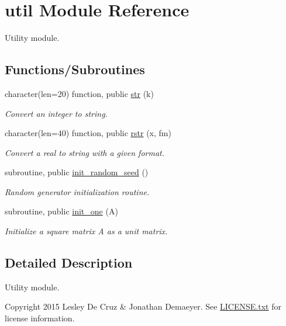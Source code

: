 \hypertarget{namespaceutil}{}\section{util Module Reference}
\label{namespaceutil}


Utility module.  


\subsection*{Functions/\+Subroutines}
\begin{DoxyCompactItemize}
\item 
character(len=20) function, public \hyperlink{namespaceutil_a1df36d0696c9183ceb6bb770f1d88111}{str} (k)
\begin{DoxyCompactList}\small\item\em Convert an integer to string. \end{DoxyCompactList}\item 
character(len=40) function, public \hyperlink{namespaceutil_ac1630658a46867b1f7255eaa51198bf3}{rstr} (x, fm)
\begin{DoxyCompactList}\small\item\em Convert a real to string with a given format. \end{DoxyCompactList}\item 
subroutine, public \hyperlink{namespaceutil_a3c2dcf05b068a55f0066d2b393e75dc7}{init\+\_\+random\+\_\+seed} ()
\begin{DoxyCompactList}\small\item\em Random generator initialization routine. \end{DoxyCompactList}\item 
subroutine, public \hyperlink{namespaceutil_aca7f2465fedb87fef954d8f0c30668c7}{init\+\_\+one} (A)
\begin{DoxyCompactList}\small\item\em Initialize a square matrix A as a unit matrix. \end{DoxyCompactList}\end{DoxyCompactItemize}


\subsection{Detailed Description}
Utility module. 

\begin{DoxyCopyright}{Copyright}
2015 Lesley De Cruz \& Jonathan Demaeyer. See \hyperlink{LICENSE_8txt}{L\+I\+C\+E\+N\+S\+E.\+txt} for license information. 
\end{DoxyCopyright}


